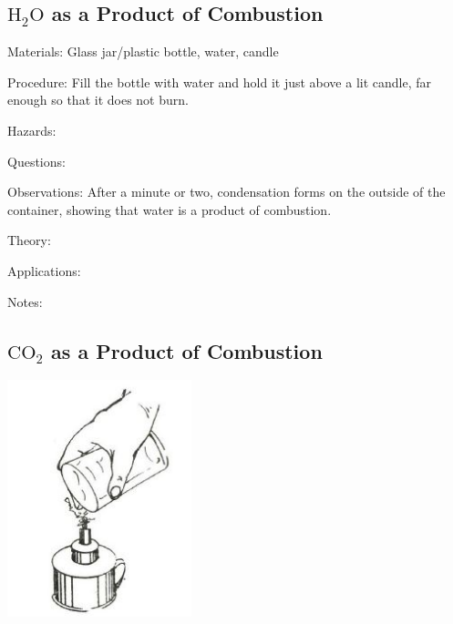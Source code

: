 \begin{multicols}{2}
\subsection{$\mathrm{H_2O}$ as a Product of Combustion} %


\begin{description*}
\item[Materials:]{Glass jar/plastic bottle, water, candle}
\item[Procedure:]{Fill the bottle with water and hold it just above a lit candle, far enough so that it does not burn.}
\item[Hazards:]{}
\item[Questions:]{}
\item[Observations:]{After a minute or two, condensation forms on the outside of the container, showing that water is a product of combustion.}
\item[Theory:]{}
\item[Applications:]{}
\item[Notes:]{}
\end{description*}

\subsection{$\mathrm{CO_2}$ as a Product of Combustion}

\begin{center}
\includegraphics[width=0.4\textwidth]{./img/source/co2-extinguisher.jpg}
\end{center}


\end{multicols}
